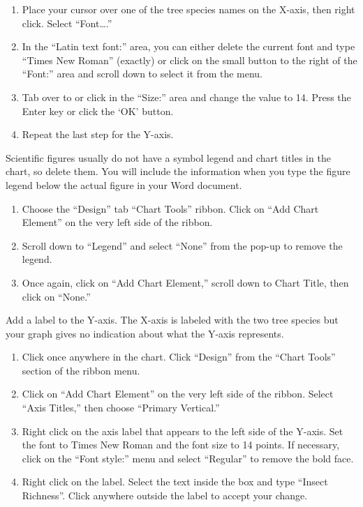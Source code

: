 \documentclass[11pt]{article}
\begin{document}
\begin{enumerate}[resume]
	\item Place your cursor over one of the tree species names on the X-axis, then right click. Select “Font….”

	\item In the “Latin text font:” area, you can either delete the current font and type “Times New Roman” (exactly) or click on the small button to the right of the “Font:” area and scroll down to select it from the menu. 

	\item Tab over to or click in the “Size:” area and change the value to 14. Press the Enter key or click the ‘OK’ button.

	\item Repeat the last step for the Y-axis.
\end{enumerate}

Scientific figures usually do not have a symbol legend and chart titles in the chart, so delete them.  You will include the information when you type the figure legend below the actual figure in your Word document. 

\begin{enumerate}[resume]
	\item Choose the “Design” tab “Chart Tools” ribbon. Click on “Add Chart Element” on the very left side of the ribbon.  
	
	\item Scroll down to “Legend” and select “None” from the pop-up to remove the legend.
	
	\item Once again, click on “Add Chart Element,” scroll down to Chart Title, then click on “None.”

\end{enumerate}

Add a label to the Y-axis. The X-axis is labeled with the two tree species but your graph gives no indication about what the Y-axis represents.

\begin{enumerate}[resume]
	\item Click once anywhere in the chart. Click “Design” from the “Chart Tools” section of the ribbon menu. 

	\item Click on “Add Chart Element” on the very left side of the ribbon.  Select “Axis Titles,” then choose “Primary Vertical.”

	\item Right click on the axis label that appears to the left side of the Y-axis. Set the font to Times New Roman and the font size to 14 points. If necessary, click on the “Font style:” menu and select “Regular” to remove the bold face.

	\item Right click on the label. Select the text inside the box and type “Insect Richness”. Click anywhere outside the label to accept your change.
\end{enumerate}
\end{document}
